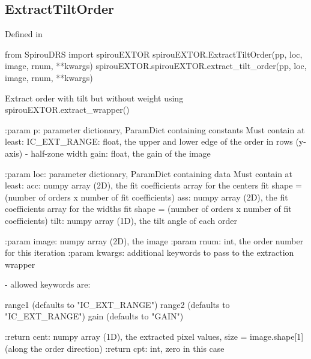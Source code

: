 \noindent\begin{minipage}{\textwidth}
\subsection{ExtractTiltOrder}

Defined in \spirouEXTOR{}

\begin{pythonbox}
from SpirouDRS import spirouEXTOR
spirouEXTOR.ExtractTiltOrder(pp, loc, image, rnum, **kwargs)
spirouEXTOR.spirouEXTOR.extract_tilt_order(pp, loc, image, rnum, **kwargs)
\end{pythonbox}

\begin{pythondocstring}
Extract order with tilt but without weight using
spirouEXTOR.extract_wrapper()

:param p: parameter dictionary, ParamDict containing constants
    Must contain at least:
            IC_EXT_RANGE: float, the upper and lower edge of the order
                          in rows (y-axis) - half-zone width
            gain: float, the gain of the image

:param loc: parameter dictionary, ParamDict containing data
        Must contain at least:
            acc: numpy array (2D), the fit coefficients array for
                  the centers fit
                  shape = (number of orders x number of fit coefficients)
            ass: numpy array (2D), the fit coefficients array for
                  the widths fit
                  shape = (number of orders x number of fit coefficients)
            tilt: numpy array (1D), the tilt angle of each order

:param image: numpy array (2D), the image
:param rnum: int, the order number for this iteration
:param kwargs: additional keywords to pass to the extraction wrapper

        - allowed keywords are:

        range1  (defaults to "IC_EXT_RANGE")
        range2  (defaults to "IC_EXT_RANGE")
        gain    (defaults to "GAIN")

:return cent: numpy array (1D), the extracted pixel values,
             size = image.shape[1] (along the order direction)
:return cpt: int, zero in this case
\end{pythondocstring}
\end{minipage}


